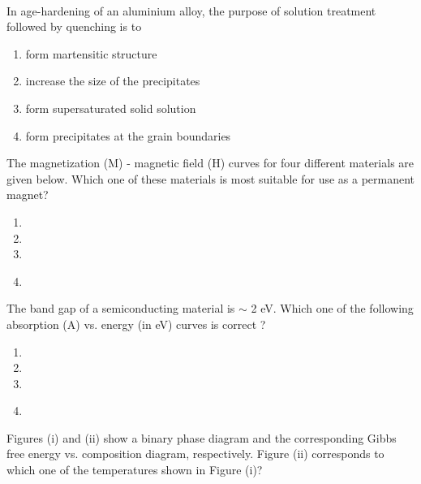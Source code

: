 \begin{figure}[!ht]
\centering
\resizebox{0.5\textwidth}{!}{%

}%
\end{figure} \\
\item In age-hardening of an aluminium alloy, the purpose of solution treatment
followed by quenching is to
\begin{enumerate}
    \item form martensitic structure
    \item increase the size of the precipitates
    \item form supersaturated solid solution
    \item form precipitates at the grain boundaries \\
\end{enumerate}
\item The magnetization (M) - magnetic field (H) curves for four different materials are given below. Which one of these materials is most suitable for use as a permanent magnet?
\begin{enumerate}
    \item \resizebox{0.4\textwidth}{!}{%

}%
\item \resizebox{0.4\textwidth}{!}{%

}%
\item \resizebox{0.4\textwidth}{!}{%

}%
\item \resizebox{0.4\textwidth}{!}{%

}%
\\
\end{enumerate}
\item The band gap of a semiconducting material is $\sim$ 2 eV. Which one of the following absorption (A) vs. energy (in eV) curves is correct ?
\begin{enumerate}
    \item \resizebox{0.4\textwidth}{!}{%

}%
\item \resizebox{0.4\textwidth}{!}{%

}%
\item \resizebox{0.4\textwidth}{!}{%

}%
\item \resizebox{0.4\textwidth}{!}{%

}%
\\
\end{enumerate}
\item Figures (i) and (ii) show a binary phase diagram and the corresponding Gibbs free energy  vs. composition  diagram, respectively. Figure (ii) corresponds to which one of the temperatures shown in Figure (i)?
